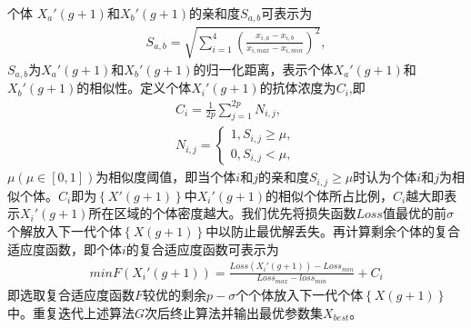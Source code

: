 \documentclass{whutmod}
\begin{document}
		个体 $X_a '(g+1)$和$X_b '(g+1)$的亲和度$S_{a,b}$可表示为
		\begin{gather}
		S_{a,b}=\sqrt{\sum _{i=1}^4( \frac{x_{i,a}-x_{i,b}}{x_{i,max}-x_{i,min}})^2},
		\end{gather}
		$S_{a,b}$为$X_a '(g+1)$和$X_b '(g+1)$的归一化距离，表示个体$X_a '(g+1)$和$X_b '(g+1)$的相似性。定义个体$X_i '(g+1)$的抗体浓度为$C_{i}$,即
		\begin{gather*}
		C_{i}=\frac{1}{2p}\sum _{j=1}^{2p} N_{i,j},\\
		N_{i,j}=\left\{\begin{matrix}1,S_{i,j}\geqslant \mu ,
		\\ 0,S_{i,j}< \mu ,
		\end{matrix}\right.
		\end{gather*}
		$\mu(\mu\in[0,1])$为相似度阈值，即当个体$i$和$j$的亲和度$S_{i,j}\geqslant \mu$时认为个体$i$和$j$为相似个体。$C_{i}$即为$\left \{ X '(g+1)\right \}$中$X_i '(g+1)$的相似个体所占比例，$C_{i}$越大即表示$X_i '(g+1)$所在区域的个体密度越大。我们优先将损失函数$Loss$值最优的前$\sigma$个解放入下一代个体$\left \{ X(g+1)\right \}$中以防止最优解丢失。再计算剩余个体的复合适应度函数，即个体$i$的复合适应度函数可表示为
	    \begin{gather}
	  min F(X_i '(g+1))=\frac{Loss(X_i '(g+1))-Loss_{min}}{Loss_{max}-loss_{min}}+C_{i}
		\end{gather}
		即选取复合适应度函数$F$较优的剩余$p-\sigma$个个体放入下一代个体$\left \{ X(g+1)\right \}$中。重复迭代上述算法$G$次后终止算法并输出最优参数集$X_{best}$。
		
		
		
\end{document}
